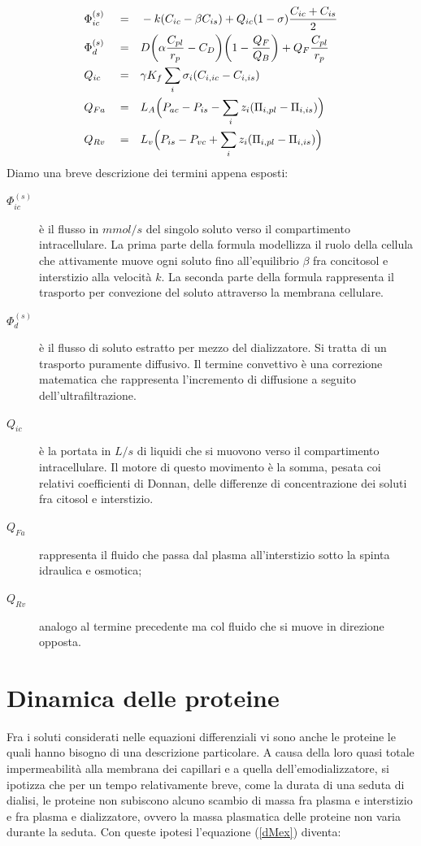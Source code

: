 \begin{align}
		&\Phi_{ic}^{(s)}& &=& &-k(C_{ic} - \beta C_{is})+ Q_{ic}(1-\sigma)\frac{C_{ic}+C_{is}}{2} \label{Phi_ic} \\
		&\Phi_d^{(s)}&    &=& &D\biggl(\alpha \frac{C_{pl}}{r_p}-C_D\biggr)\biggl(1-\frac{Q_F}{Q_B}\biggr)+Q_F \frac{C_{pl}}{r_p} \\
		&Q_{ic}&          &=& &\gamma K_f \sum_i{\sigma_i(C_{i,ic}-C_{i,is})} \label{Qic} \\
		&Q_{Fa}&          &=& &L_A\Bigl( P_{ac}-P_{is} - \sum_i{z_i(\Pi_{i,pl}-\Pi_{i,is})}\Bigr) \label{Qfa} \\
		&Q_{Rv}&          &=& &L_v\Bigl( P_{is}-P_{vc} +\sum_i{z_i(\Pi_{i,pl}-\Pi_{i,is})}\Bigr) \label{Qrv}
\end{align}
\newline
Diamo una breve descrizione dei termini appena esposti:
\begin{description}
	\item[$\Phi_{ic}^{(s)}$] è il flusso in $mmol/s$ del singolo soluto verso il compartimento intracellulare. La prima parte della formula modellizza il 													 ruolo della cellula che attivamente muove ogni soluto fino all'equilibrio $\beta$ fra concitosol e interstizio alla velocità 													 $k$. La seconda parte della formula rappresenta il trasporto per convezione del soluto attraverso la membrana cellulare.
	\item[$\Phi_d^{(s)}$]    è il flusso di soluto estratto per mezzo del dializzatore. Si tratta di un trasporto puramente diffusivo. Il termine 																	 convettivo è una correzione matematica che rappresenta l'incremento di diffusione a seguito dell'ultrafiltrazione.
	\item[$Q_{ic}$]          è la portata in $L/s$ di liquidi che si muovono verso il compartimento intracellulare. Il motore di questo movimento è la 															 somma, pesata coi relativi coefficienti di Donnan, delle differenze di concentrazione dei soluti fra citosol e interstizio.
	\item[$Q_{Fa}$]          rappresenta il fluido che passa dal plasma all'interstizio sotto la spinta idraulica e osmotica;
	\item[$Q_{Rv}$]          analogo al termine precedente ma col fluido che si muove in direzione opposta.	
\end{description}

\section{Dinamica delle proteine}
Fra i soluti considerati nelle equazioni differenziali vi sono anche le proteine le quali hanno bisogno di una descrizione particolare. A causa della loro quasi totale impermeabilità alla membrana dei capillari e a quella dell'emodializzatore, si ipotizza che per un tempo relativamente breve, come la durata di una seduta di dialisi, le proteine non subiscono alcuno scambio di massa fra plasma e interstizio e fra plasma e dializzatore, ovvero la massa plasmatica delle proteine non varia durante la seduta. Con queste ipotesi l'equazione (\ref{dMex}) diventa:

